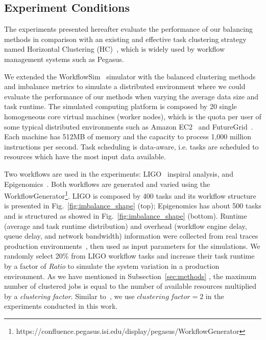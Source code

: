 \subsection{Experiment Conditions}
\label{sec:experiments}

The experiments presented hereafter evaluate the performance of our balancing methods in comparison with an existing and effective task clustering strategy named Horizontal Clustering (HC)~\cite{Singh:2008:WTC:1341811.1341822}, which is widely used by workflow management systems such as Pegasus. 


We extended the WorkflowSim~\cite{Chen2012a} simulator with the balanced clustering methods and imbalance metrics to simulate a distributed environment where we could evaluate the performance of our methods when varying the average data size and task runtime. The simulated computing platform is composed by 20 single homogeneous core virtual machines (worker nodes), which is the quota per user of some typical distributed environments such as Amazon EC2~\cite{AmazonAWS} and FutureGrid~\cite{FutureGrid}. Each machine has 512MB of memory and the capacity to process 1,000 million instructions per second. Task scheduling is data-aware, i.e. tasks are scheduled to resources which have the most input data available.

Two workflows are used in the experiments: LIGO~\cite{LIGO} inspiral analysis, and Epigenomics~\cite{Epigenome}. 
Both workflows are generated and varied using the WorkflowGenerator\footnote[1]{https://confluence.pegasus.isi.edu/display/pegasus/WorkflowGenerator}. LIGO is composed by 400 tasks and its workflow structure is presented in Fig.~\ref{fig:imbalance_shape} (top); Epigenomics has about 500 tasks and is structured as showed in Fig.~\ref{fig:imbalance_shape} (bottom). Runtime (average and task runtime distribution) and overhead (workflow engine delay, queue delay, and network bandwidth) information were collected from real traces production environments~\cite{Chen2011, Juve2013}, then used as input parameters for the simulations.
We randomly select 20\% from LIGO workflow tasks and increase their task runtime by a factor of \emph{Ratio} to simulate the system variation in a production environment.
As we have mentioned in Subsection~\ref{sec:methods} , the maximum number of clustered jobs is equal to the number of available resources multiplied by a \emph{clustering factor}. Similar to~\cite{Chen-balanced-2013}, we use $clustering~factor=2$ in the experiments conducted in this work. 

